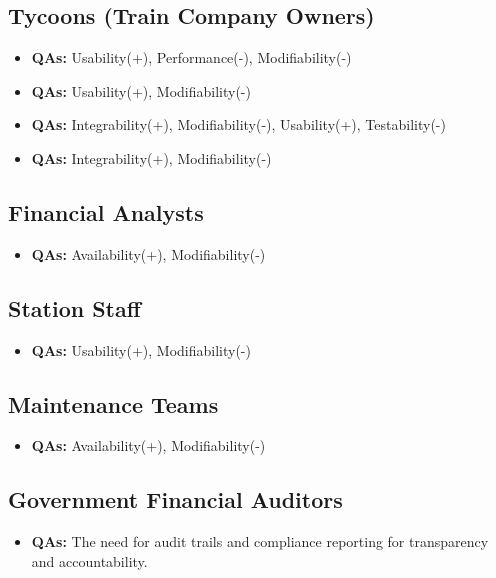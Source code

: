 \subsection{Tycoons (Train Company Owners)}
\begin{itemize}
    \item \userStoryTwentyOne \textbf{QAs:} Usability(+), Performance(-), Modifiability(-)
    \item \userStoryTwentyTwo \textbf{QAs:} Usability(+), Modifiability(-)
    \item \userStoryTwentyThree \textbf{QAs:} Integrability(+), Modifiability(-), Usability(+), Testability(-)
    \item \userStoryTwentyFour \textbf{QAs:} Integrability(+), Modifiability(-)
\end{itemize}

\subsection{Financial Analysts}
\begin{itemize}
    \item \userStoryTwentyFive \textbf{QAs:} Availability(+), Modifiability(-)
\end{itemize}

\subsection{Station Staff}
\begin{itemize}
    \item \userStoryTwentySix \textbf{QAs:} Usability(+), Modifiability(-)
\end{itemize}

\subsection{Maintenance Teams}
\begin{itemize}
    \item \userStoryTwentySeven \textbf{QAs:} Availability(+), Modifiability(-)
\end{itemize}

\subsection{Government Financial Auditors}
\begin{itemize}
    \item \userStoryTwentyEight \textbf{QAs:} The need for audit trails and compliance reporting for transparency and accountability.
\end{itemize}

